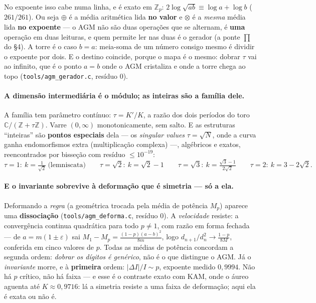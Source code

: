 \documentclass[11pt]{article}
\newcommand{\code}[1]{\texttt{\small #1}}
\newcommand{\Z}{\mathbb Z}
\theoremstyle{plain}
\theoremstyle{remark}
\begin{document}
No expoente isso cabe numa linha, e é exato em $\Z_p$: $2\log\sqrt{ab}\equiv\log a+\log b$ ($261/261$).
Ou seja $\oplus$ é a média aritmética lida \textbf{no valor} e $\otimes$ é a \emph{mesma} média lida
\textbf{no expoente} --- o AGM não são duas operações que se alternam, é \textbf{uma} operação em duas
leituras, e quem permite ler nas duas é o gerador (a ponte $\prod$ do §4). A torre é o caso $b=a$:
meia-soma de um número consigo mesmo é dividir o expoente por dois. E o destino coincide, porque o mapa
é o mesmo: dobrar $\tau$ vai ao infinito, que é o ponto $a=b$ onde o AGM cristaliza e onde a torre chega
ao topo (\code{tools/agm\_gerador.c}, resíduo $0$).

\paragraph{A dimensão intermediária é o módulo; as inteiras são a família dele.} A família tem
parâmetro contínuo: $\tau=K'/K$, a razão dos dois períodos do toro $\mathbb C/(\Z+\tau\Z)$. Varre
$(0,\infty)$ monotonicamente, sem salto. E as estruturas ``inteiras'' são \textbf{pontos especiais}
dela --- os \emph{singular values} $\tau=\sqrt N$, onde a curva ganha endomorfismos extra
(multiplicação complexa) ---, algébricos e exatos, reencontrados por bisseção com resíduo
$\le10^{-19}$:
\[
 \tau=1:\ k=\tfrac{1}{\sqrt2}\ \text{(lemniscata)}\qquad \tau=\sqrt2:\ k=\sqrt2-1 \qquad
 \tau=\sqrt3:\ k=\tfrac{\sqrt3-1}{2\sqrt2} \qquad \tau=2:\ k=3-2\sqrt2.
\]

\paragraph{E o invariante sobrevive à deformação que é simetria --- só a ela.} Deformando a
\emph{regra} (a geométrica trocada pela média de potência $M_p$) aparece uma \textbf{dissociação}
(\code{tools/agm\_deforma.c}, resíduo $0$). A \emph{velocidade} resiste: a convergência continua
quadrática para todo $p\neq1$, com razão em forma fechada --- de $a=m(1\pm\varepsilon)$ sai
$M_1-M_p=\frac{(1-p)(a-b)^2}{8m}$, logo $d_{n+1}/d_n^2\to\frac{1-p}{8M}$, conferida em cinco valores
de $p$. Todas as médias de potência concordam a segunda ordem: \emph{dobrar os dígitos é genérico},
não é o que distingue o AGM. Já o \emph{invariante} morre, e à \textbf{primeira} ordem:
$|\Delta I|/I\sim p$, expoente medido $0{,}9994$. Não há $p$ crítico, não há faixa --- e esse é o
contraste exato com KAM, onde o áureo aguenta até $K\approx0{,}9716$: lá a simetria resiste a uma
faixa de deformação; aqui ela é exata ou não é.
\end{document}
